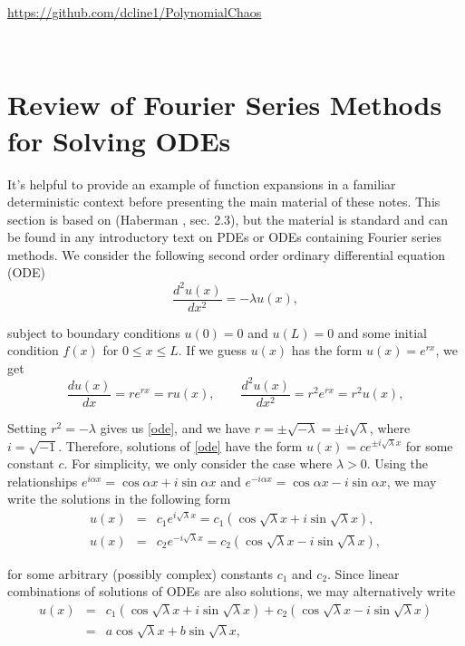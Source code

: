 \documentclass[11pt]{article}
\numberwithin{equation}{section}
\begin{document}
\begin{center}
\href{https://github.com/dcline1/PolynomialChaos/}{https://github.com/dcline1/PolynomialChaos}
\end{center}

\




\section{Review of Fourier Series Methods for Solving ODEs}

It's helpful to provide an example of function expansions in a familiar deterministic context before presenting the main material of these notes. This section is based on (Haberman \cite{H03}, sec. 2.3), but the material is standard and can be found in any introductory text on PDEs or ODEs containing Fourier series methods. We consider the following second order ordinary differential equation (ODE)
\begin{equation}
\frac{d^2 u(x)}{dx^2} = -\lambda u(x), \label{ode}
\end{equation}

subject to boundary conditions $u(0) = 0$ and $u(L) = 0$ and some initial condition $f(x)$ for $0 \leq x \leq L$. If we guess $u(x)$ has the form $u(x) = e^{rx}$, we get
\begin{equation*}
\frac{du(x)}{dx} = r e^{rx} = r u(x), \qquad \frac{d^2 u(x)}{dx^2} = r^2 e^{rx} = r^2 u(x),
\end{equation*}

Setting $r^2 = -\lambda$ gives us \eqref{ode}, and we have $r = \pm \sqrt{-\lambda} = \pm i \sqrt{\lambda}$, where $i = \sqrt{-1}$. Therefore, solutions of \eqref{ode} have the form $u(x) = c e^{\pm i \sqrt{\lambda} x}$ for some constant $c$. For simplicity, we only consider the case where $\lambda > 0$. Using the relationships $e^{i \alpha x} = \cos \alpha x + i \sin \alpha x$ and $e^{-i \alpha x} = \cos \alpha x - i \sin \alpha x$, we may write the solutions in the following form
\begin{eqnarray*}
u(x) & = & c_1 e^{i \sqrt{\lambda} x} = c_1 ( \cos \sqrt{\lambda} x + i \sin \sqrt{\lambda} x ), \\
u(x) & = & c_2 e^{-i \sqrt{\lambda} x} = c_2 ( \cos \sqrt{\lambda} x - i \sin \sqrt{\lambda} x ), 
\end{eqnarray*}

for some arbitrary (possibly complex) constants $c_1$ and $c_2$. Since linear combinations of solutions of ODEs are also solutions, we may alternatively write
\begin{eqnarray}
u(x) & = & c_1 ( \cos \sqrt{\lambda} x + i \sin \sqrt{\lambda} x ) +c_2 ( \cos \sqrt{\lambda} x - i \sin \sqrt{\lambda} x )  \nonumber \\
& = & a \cos \sqrt{\lambda} x + b \sin \sqrt{\lambda} x, \label{sol}
\end{eqnarray}
\end{document}
